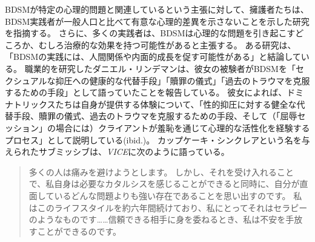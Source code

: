 \documentclass[paper=a4,book,openany]{jlreq}
\begin{document}
BDSMが特定の心理的問題と関連しているという主張に対して、擁護者たちは、BDSM実践者が一般人口と比べて有意な心理的差異を示さないことを示した研究を指摘する\citep{hebert14:_examin_person_charac_assoc_bdsm_orien,powls12:_descr_review_resear_relat_sadom}。
さらに、多くの実践者は、BDSMは心理的な問題を引き起こすどころか、むしろ治療的な効果を持つ可能性があると主張する。
ある研究は、「BDSMの実践には、人間関係や内面的成長を促す可能性がある」と結論している\citep[pp. 157-158]{weille02:_psych_consen_sadom_domin_submis_sexual_games}。
職業的を研究したダニエル・リンデマンは、彼女の被験者がBDSMを「セクシュアルな抑圧への健康的な代替手段」「贖罪の儀式」「過去のトラウマを克服するための手段」として語っていたことを報告している\citep[p.157]{lindemann11:_bdsm_therap}。
彼女によれば、ドミナトリックスたちは自身が提供する体験について、「性的抑圧に対する健全な代替手段、贖罪の儀式、過去のトラウマを克服するための手段、そして（「屈辱セッション」の場合には）クライアントが羞恥を通じて心理的な活性化を経験するプロセス」として説明している(ibid.)。
カップケーキ・シンクレアという名を与えられたサブミッシブは、\emph{VICE}に次のように語っている。

\begin{quote}
多くの人は痛みを避けようとします。
しかし、それを受け入れることで、私自身は必要なカタルシスを感じることができると同時に、自分が直面しているどんな問題よりも強い存在であることを思い出すのです。
私はこのライフスタイルを約六年間続けており、私にとってそれはセラピーのようなものです……信頼できる相手に身を委ねるとき、私は不安を手放すことができるのです。
\citep{barrett-ibarria17:_bsdm_can_provid_profoun_healin_exper}
\end{quote}
\end{document}
